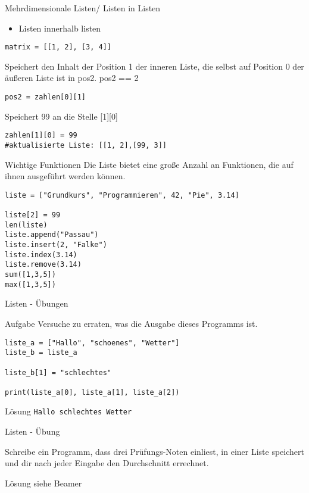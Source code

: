 \begin{frame}[fragile]{Mehrdimensionale Listen/ Listen in Listen}
\begin{itemize}
	\item Listen innerhalb listen	
\end{itemize}
\begin{lstlisting}
matrix = [[1, 2], [3, 4]]
\end{lstlisting}
Speichert den Inhalt der Position 1 der inneren Liste, die selbst auf Position 0 der {\"a}u{\ss}eren Liste ist in pos2. pos2 == 2
\begin{lstlisting}
pos2 = zahlen[0][1]
\end{lstlisting}
Speichert 99 an die Stelle [1][0]
\begin{lstlisting}
zahlen[1][0] = 99
#aktualisierte Liste: [[1, 2],[99, 3]]
\end{lstlisting}
\end{frame}



\begin{frame}[fragile]{Wichtige Funktionen}
Die Liste bietet eine große Anzahl an  Funktionen, die auf ihnen
ausgeführt werden können.

\begin{lstlisting}
liste = ["Grundkurs", "Programmieren", 42, "Pie", 3.14]

liste[2] = 99
len(liste)
liste.append("Passau")
liste.insert(2, "Falke")
liste.index(3.14)
liste.remove(3.14)
sum([1,3,5])
max([1,3,5])
\end{lstlisting}
\end{frame}


\begin{frame}[fragile]{Listen - Übungen}
\begin{block}{Aufgabe}
Versuche zu erraten, was die Ausgabe dieses Programms ist.
\end{block}

\begin{lstlisting}
liste_a = ["Hallo", "schoenes", "Wetter"]
liste_b = liste_a

liste_b[1] = "schlechtes"

print(liste_a[0], liste_a[1], liste_a[2])  
\end{lstlisting}
\pause{}
\begin{exampleblock}{Lösung}
    \texttt{Hallo schlechtes Wetter}
\end{exampleblock}
\end{frame}

\begin{frame}[fragile]{Listen - Übung}

Schreibe ein Programm, dass drei Prüfungs-Noten einliest, in einer
Liste speichert und dir nach jeder Eingabe den Durchschnitt errechnet. 
\pause{}
\begin{exampleblock}{Lösung}
siehe Beamer
\end{exampleblock}
\end{frame}

